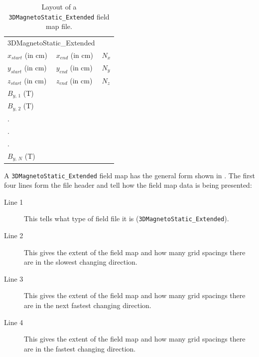 \begin{table}[h!]
    \caption{Layout of a \texttt{3DMagnetoStatic\_Extended} field map file.}
    \label{tab:3DMagnetoStatic_Extended}
    \begin{center}
    \begin{tabular}{lll}
      \hline
      \multicolumn{2}{l}{3DMagnetoStatic\_Extended}  &           \\
      $x_{start}$ (in cm)       & $x_{end}$ (in cm)  & $N_{x}$   \\
      $y_{start}$ (in cm)       & $y_{end}$ (in cm)  & $N_{y}$   \\
      $z_{start}$ (in cm)       & $z_{end}$ (in cm)  & $N_{z}$   \\
      $B_{y,\,1}$ (T)           &                    &           \\
      $B_{y,\,2}$ (T)           &                    &           \\
      .                         &                    &           \\
      .                         &                    &           \\
      .                         &                    &           \\
      $B_{y,\,N}$ (T)           &                    &           \\
      \hline
    \end{tabular}
    \end{center}
\end{table}

A \texttt{3DMagnetoStatic\_Extended} field map has the general form shown in . The first four lines form the file header and tell \opalt how the field map data is being presented:

\begin{description}
\item[Line 1] This tells \opalt what type of field file it is (\texttt{3DMagnetoStatic\_Extended}).
\item[Line 2] This gives the extent of the field map and how many grid spacings there are in the slowest changing direction.
\item[Line 3] This gives the extent of the field map and how many grid spacings there are in the next fastest changing direction.
\item[Line 4] This gives the extent of the field map and how many grid spacings there are in the fastest changing direction.
\end{description}

